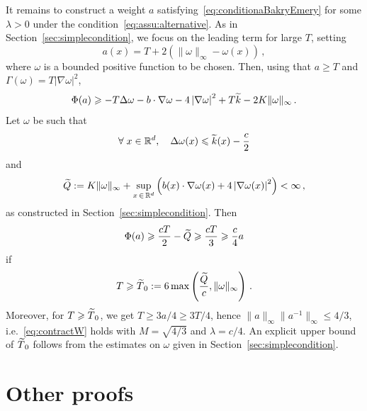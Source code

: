 \documentclass[10pt]{amsart}
\theoremstyle{definition}\newtheorem{defi}[theo]{Definition}\newtheorem{rema}[theo]{Remark}\newtheorem{exam}[theo]{Example}\newtheorem{exem}[theo]{Example}\newtheorem{nota}[theo]{Notation}
\newcommand{\R}{\mathbb R}
\newcommand{\na}{\nabla}
\newcommand{\1}{\mathbbm{1}}
\newcommand{\nv}[1]{#1}
\let\oldtilde\tilde
\renewcommand*{\tilde}[1]{\mathchoice{\widetilde{#1}}{\widetilde{#1}}{\oldtilde{#1}}{\oldtilde{#1}}}
\let\oldforall\forall
\renewcommand*{\forall}{\mathrel{\oldforall}}
\begin{document}
It remains to construct a weight $a$ satisfying~\eqref{eq:conditionaBakryEmery} for some $\lambda>0$ under the condition~\eqref{eq:assu:alternative}. As in Section~\ref{sec:simplecondition}, we focus on the leading term for large $T$, setting
\[
a(x) = T + 2\left( \|\nv{\omega}\|_\infty - \nv{\omega}(x) \right) \,,
\]
where $\nv{\omega}$ is a bounded positive function to be chosen. Then, using that $a\geqslant T$ \nv{and $\Gamma(\omega)=T|\na \omega|^2$,}
\[
\Phi(a) \geqslant -T\Delta \nv{\omega} - b\cdot \na \nv{\omega} - 4\left|\nabla \nv{\omega}\right|^2 + T \tilde k -2 K\|\nv{\omega}\|_\infty \,.
\]
Let $\nv{\omega}$ be such that
\[
\forall x\in\R^d, \quad \Delta \nv{\omega} (x) \leqslant \tilde k(x) -\frac{c}{2}
\]
and
\[
\tilde Q:= K \|\nv{\omega}\|_\infty + \sup_{x\,\in\,\R^d}\left( b(x)\cdot \na \nv{\omega}(x) + 4\left|\na \nv{\omega}(x)\right|^2 \right)<\infty \,,
\]
as constructed in Section~\ref{sec:simplecondition}. Then
\[
\Phi(a) \geqslant \frac {cT}2 - \tilde Q \geqslant \frac{cT}{3} \geqslant \frac c4 a
\]
if
\[
T\geqslant \tilde T_0 := 6 \max \left( \frac{\tilde Q}{c},\|\nv{\omega}\|_\infty \right) \,.
\]
Moreover, for $T\geqslant \tilde T_0$, we get $T\geqslant 3 a/4 \geqslant 3T/4$, hence $\|a\|_\infty \|a^{-1}\|_\infty \leqslant 4/3$, i.e.~\eqref{eq:contractW} holds with $M=\sqrt{4/3}$ and $\lambda=c/4$. An explicit upper bound of $\tilde T_0$ follows from the estimates on $\nv{\omega}$ given in Section~\ref{sec:simplecondition}.

\section{Other proofs}\label{Sec:AutresPreuves}
\end{document}
